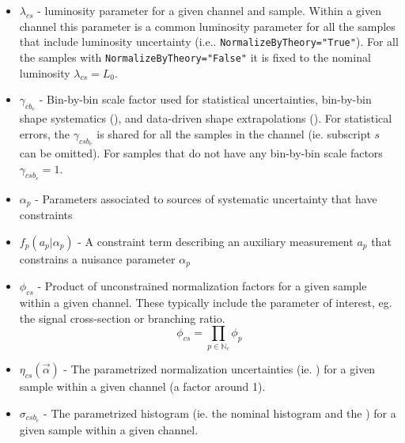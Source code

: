 \begin{itemize}
\item $ \lambda_{cs}$ - luminosity parameter for a given channel and sample.  Within a given channel this parameter is a common luminosity parameter for all the samples that include luminosity uncertainty (i.e.. \texttt{NormalizeByTheory="True"}).  For all the samples with  \texttt{NormalizeByTheory="False"} it is fixed to the nominal luminosity $\lambda_{cs}=L_0$.
\item $\gamma_{cb_e}$ - Bin-by-bin scale factor used for statistical uncertainties, bin-by-bin shape systematics (\SS), and data-driven shape extrapolations (\SF).  For statistical errors, the $\gamma_{csb_e}$ is shared for all the samples in the channel (ie. subscript $s$ can be omitted).  For samples that do not have any bin-by-bin scale factors $\gamma_{csb_e}=1$.
\item $\alpha_p$ - Parameters associated to sources of systematic uncertainty that have constraints
\item $f_p(a_p|\alpha_p)$ - A constraint term describing an auxiliary measurement $a_p$ that constrains a nuisance parameter $\alpha_p$
\item $ \phi_{cs}$ - Product of unconstrained normalization factors for a given sample within a given channel.  These typically include the parameter of interest, eg. the signal cross-section or branching ratio.
 \begin{equation}
 \phi_{cs}= \prod_{p\in\mathbb{N}_c} \phi_p
 \end{equation}
\item $\eta_{cs}(\vec\alpha)$  - The parametrized normalization uncertainties (ie. \OS) for a given sample within a given channel (a factor around 1).
\item $\sigma_{csb_e}$  - The parametrized histogram (ie. the nominal histogram and the \HS) for a given sample within a given channel.
\end{itemize}

